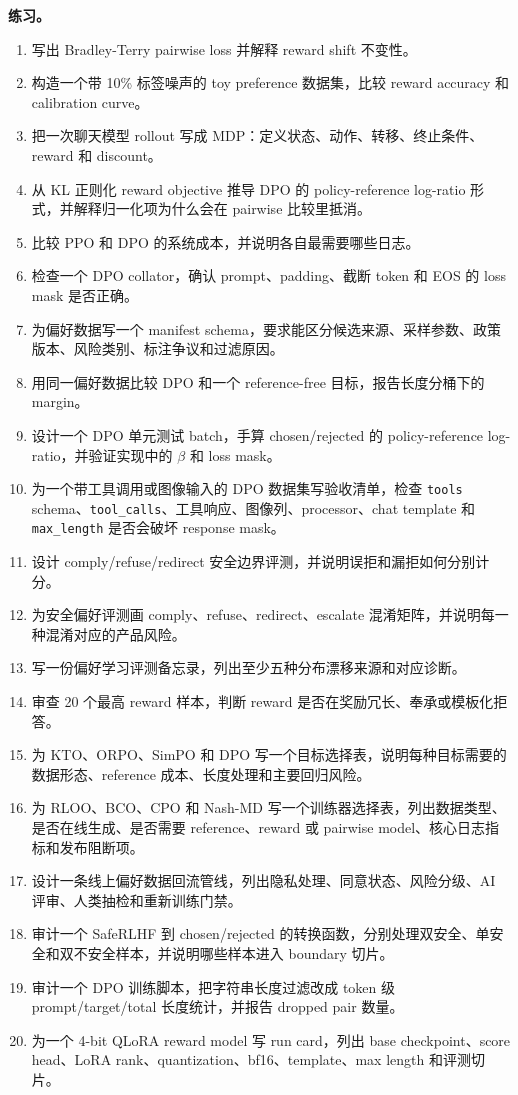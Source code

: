 \documentclass[UTF8,zihao=-4,openany]{ctexbook}
\begin{document}
\textbf{练习。}
\begin{enumerate}
\item 写出 Bradley-Terry pairwise loss 并解释 reward shift 不变性。
\item 构造一个带 10\% 标签噪声的 toy preference 数据集，比较 reward accuracy 和 calibration curve。
\item 把一次聊天模型 rollout 写成 MDP：定义状态、动作、转移、终止条件、reward 和 discount。
\item 从 KL 正则化 reward objective 推导 DPO 的 policy-reference log-ratio 形式，并解释归一化项为什么会在 pairwise 比较里抵消。
\item 比较 PPO 和 DPO 的系统成本，并说明各自最需要哪些日志。
\item 检查一个 DPO collator，确认 prompt、padding、截断 token 和 EOS 的 loss mask 是否正确。
\item 为偏好数据写一个 manifest schema，要求能区分候选来源、采样参数、政策版本、风险类别、标注争议和过滤原因。
\item 用同一偏好数据比较 DPO 和一个 reference-free 目标，报告长度分桶下的 margin。
\item 设计一个 DPO 单元测试 batch，手算 chosen/rejected 的 policy-reference log-ratio，并验证实现中的 $\beta$ 和 loss mask。
\item 为一个带工具调用或图像输入的 DPO 数据集写验收清单，检查 \texttt{tools} schema、\texttt{tool\_calls}、工具响应、图像列、processor、chat template 和 \texttt{max\_length} 是否会破坏 response mask。
\item 设计 comply/refuse/redirect 安全边界评测，并说明误拒和漏拒如何分别计分。
\item 为安全偏好评测画 comply、refuse、redirect、escalate 混淆矩阵，并说明每一种混淆对应的产品风险。
\item 写一份偏好学习评测备忘录，列出至少五种分布漂移来源和对应诊断。
\item 审查 20 个最高 reward 样本，判断 reward 是否在奖励冗长、奉承或模板化拒答。
\item 为 KTO、ORPO、SimPO 和 DPO 写一个目标选择表，说明每种目标需要的数据形态、reference 成本、长度处理和主要回归风险。
\item 为 RLOO、BCO、CPO 和 Nash-MD 写一个训练器选择表，列出数据类型、是否在线生成、是否需要 reference、reward 或 pairwise model、核心日志指标和发布阻断项。
\item 设计一条线上偏好数据回流管线，列出隐私处理、同意状态、风险分级、AI 评审、人类抽检和重新训练门禁。
\item 审计一个 SafeRLHF 到 chosen/rejected 的转换函数，分别处理双安全、单安全和双不安全样本，并说明哪些样本进入 boundary 切片。
\item 审计一个 DPO 训练脚本，把字符串长度过滤改成 token 级 prompt/target/total 长度统计，并报告 dropped pair 数量。
\item 为一个 4-bit QLoRA reward model 写 run card，列出 base checkpoint、score head、LoRA rank、quantization、bf16、template、max length 和评测切片。
\end{enumerate}
\end{document}
